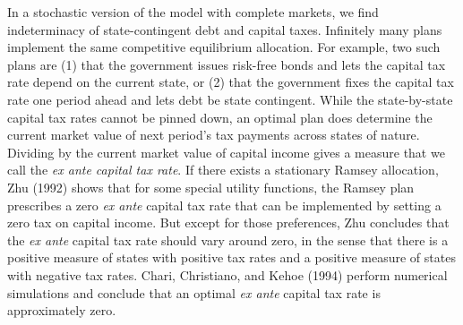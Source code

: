 In a stochastic version of the model with complete markets, we find
indeterminacy of state-contingent debt and capital taxes.
Infinitely many plans implement the same
competitive equilibrium allocation. For example,
two such plans are  (1) that the government issues risk-free
bonds and lets the capital tax rate depend on the current state,
or (2) that the government  fixes the capital tax rate one period ahead and lets
debt be state contingent. While the state-by-state capital tax
rates cannot be pinned down, an optimal plan
does determine the current market value of next period's
tax payments across states of nature. Dividing
by the current market value of capital income gives
a measure that we call the {\it ex ante capital tax rate}.
If there exists a stationary Ramsey allocation, Zhu (1992)
shows that for some special
utility functions, the Ramsey plan prescribes a zero {\it ex ante\/} capital
tax rate that can be implemented by setting a zero tax on capital
income. But except for those   preferences, Zhu concludes
that the {\it ex ante\/} capital tax rate should vary around zero, in the
sense that there is a positive measure of states with positive tax
rates and a positive measure of states with negative tax rates.  Chari,
Christiano, and Kehoe (1994)
perform numerical simulations and conclude
 that an optimal {\it ex ante\/} capital tax rate is
approximately zero.
%
%
%
%
%
%

